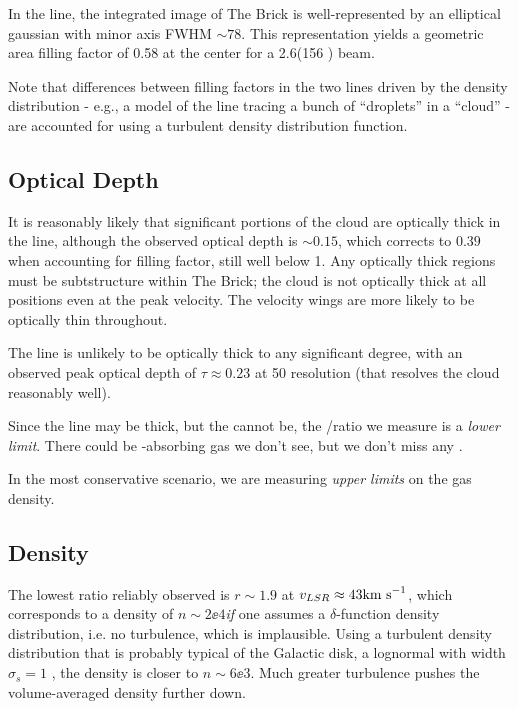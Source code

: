 In the \twotwo line, the integrated image of The Brick is well-represented by
an elliptical gaussian with minor axis FWHM $\sim78$\arcsec.  This
representation yields a geometric area filling factor of 0.58 at the center for
a 2.6\arcmin (156 \arcsec) beam.

Note that differences between filling factors in the two lines driven by the
density distribution - e.g., a model of the \twotwo line tracing a bunch of
``droplets'' in a \oneone ``cloud'' - are accounted for using a turbulent
density distribution function.

\subsection{Optical Depth}
\label{sec:opticaldepth}
It is reasonably likely that significant portions of the cloud are optically
thick in the \oneone line, although the observed optical depth is $\sim 0.15$,
which corrects to $0.39$ when accounting for filling factor, still well below
1.  Any optically thick regions must be subtstructure within The Brick; the
cloud is not optically thick at all positions even at the peak velocity.  The
velocity wings are more likely to be optically thin throughout.

The \twotwo line is unlikely to be optically thick to any significant degree,
with an observed peak optical depth of $\tau\approx0.23$ at 50 \arcsec
resolution (that resolves the cloud reasonably well).

Since the \oneone line may be thick, but the \twotwo cannot be, the
\oneone/\twotwo ratio we measure is a \emph{lower limit}.  There could be
\oneone-absorbing gas we don't see, but we don't miss any \twotwo.

In the most conservative scenario, we are measuring \emph{upper limits} on the
gas density.

\subsection{Density}
The lowest ratio reliably observed is $r\sim1.9$ at $v_{LSR}\approx 43 \textrm{km~s}^{-1}$,
which corresponds to a density of $n\sim2\ee{4}$\percc \emph{if} one assumes a
$\delta$-function density distribution, i.e. no turbulence, which is
implausible.  Using a turbulent density distribution that is probably typical
of the Galactic disk, a lognormal with width $\sigma_{s} = 1$
\citep{Ginsburg2013a,Federrath2010a}, the density is closer to $n\sim
6\ee{3}$\percc.  Much greater turbulence pushes the volume-averaged density
further down.


